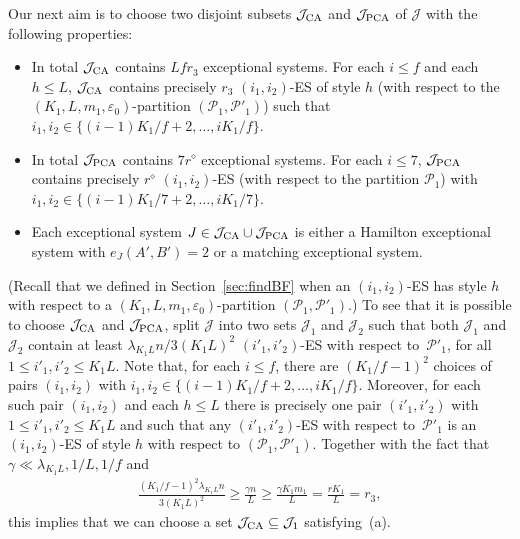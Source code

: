 \documentclass{memo-l}
\def\cP{\mathcal{P}}
\def\eps{\varepsilon}
\def\cJ{\mathcal{J}}
\numberwithin{section}{chapter}
\numberwithin{equation}{section}
\numberwithin{firstthm}{section}
\numberwithin{figure}{section}
\begin{document}
{Our next aim is to choose two disjoint subsets $\mathcal{J}_{\rm CA}$ and $\mathcal{J}_{\rm PCA}$ of $\cJ$ with the
following properties:
\begin{itemize}	
\item[(a)] In total $\mathcal{J}_{\rm CA}$ contains $L f r_3$ exceptional systems. For each $i\le f$ and each $h \le L$, $\mathcal{J}_{\rm CA}$ contains precisely $r_3$ $(i_1,i_2)$-ES of style $h$ (with respect to the $(K_1,L,m_1,\eps_0)$-partition $(\cP_1,\cP'_1)$) such that $i_1,i_2 \in \{(i-1)K_1/f+2,\dots,iK_1/f\}$.
\item[(b)] In total $\mathcal{J}_{\rm PCA}$ contains $7r^\diamond$ exceptional systems. For each $i\le 7$,
$\mathcal{J}_{\rm PCA}$ contains precisely $r^\diamond$ $(i_1,i_2)$-ES (with respect to
the partition $\cP_1$) with $i_1,i_2 \in \{(i-1)K_1/7+2,\dots,iK_1/7\}$.
\item[(c)] Each exceptional system $J\in \mathcal{J}_{\rm CA}\cup \mathcal{J}_{\rm PCA}$ is either a Hamilton exceptional system with
$e_J(A',B')=2$ or a matching exceptional system.
\end{itemize}
(Recall that we defined in Section~\ref{sec:findBF} when an $(i_1,i_2)$-ES has style $h$ with respect to a $(K_1,L,m_1,\eps_0)$-partition $(\cP_1,\cP'_1)$.)
To see that it is possible to choose $\mathcal{J}_{\rm CA}$ and $\mathcal{J}_{\rm PCA}$, split $\cJ$ into two sets $\cJ_1$ and $\cJ_2$ such that both $\cJ_1$ and $\cJ_2$
contain at least $\lambda_{K_1L} n /3(K_1L)^2$ $(i'_1,i'_2)$-ES with respect to~$\cP'_1$, for all $1 \le i'_1 , i'_2   \le K_1L$.
Note that, for each $i \le f$, there are $(K_1/f-1)^2$ choices of pairs $(i_1,i_2)$ with $i_1,i_2 \in \{(i-1)K_1/f+2,\dots,iK_1/f\}$.
Moreover, for each such pair $(i_1,i_2)$ and each $h\le L$ there is precisely one pair $(i'_1,i'_2)$ with $1 \le i'_1,i'_2  \le K_1L$
and such that any $(i'_1,i'_2)$-ES with respect to~$\cP'_1$ is an $(i_1,i_2)$-ES of style $h$ with respect to $(\cP_1,\cP'_1)$.
Together with the fact that $\gamma\ll \lambda_{K_1L}, 1/L, 1/f$ and
\begin{align*}
\frac{(K_1/f-1)^2 \lambda_{K_1L} n}{3 (K_1 L)^2} \ge
 \frac{\gamma n}{L} \ge \frac{\gamma K_1 m_1}{L} = \frac{r K_1}{L } = r_3,
\end{align*}
this implies that we can choose a set $\mathcal{J}_{\rm CA}\subseteq \cJ_1$ satisfying~(a).


}
\end{document}
